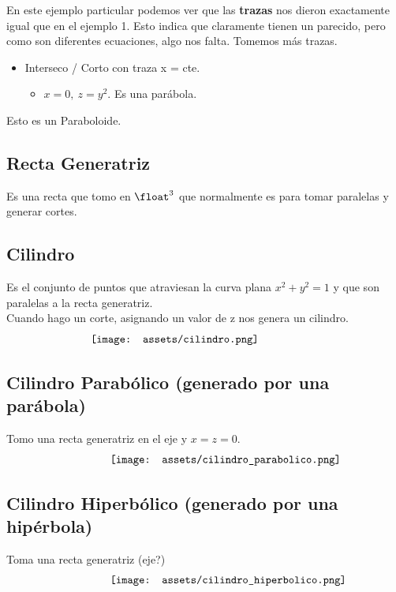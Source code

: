 \documentclass[10pt,a4paper]{article}
\begin{document}
En este ejemplo particular podemos ver que las \textbf{trazas} nos dieron exactamente igual que en el ejemplo 1. Esto indica que claramente tienen un parecido, pero como son diferentes ecuaciones, algo nos falta. Tomemos más trazas. \\
\begin{itemize}
    \item Interseco / Corto con traza x = cte.
    \begin{itemize}
        \item $x=0, \ z=y^{2}$. Es una parábola.
    \end{itemize}
\end{itemize}
Esto es un Paraboloide.
\subsection*{Recta Generatriz}
Es una recta que tomo en $\float^{3}$ que normalmente es para tomar paralelas y generar cortes.
\subsection*{Cilindro}
Es el conjunto de puntos que atraviesan la curva plana $x^{2} + y^{2} = 1$ y que son paralelas a la recta generatriz. \\
Cuando hago un corte, asignando un valor de z nos genera un cilindro.
\[\begin{minipage}[b]{0.6\textwidth}
    \texttt{[image: assets/cilindro.png]}
\end{minipage}\]
\subsection*{Cilindro Parabólico (generado por una parábola)}
Tomo una recta generatriz en el eje y $x=z=0$.
\[\begin{minipage}[b]{0.5\textwidth}
    \texttt{[image: assets/cilindro\_parabolico.png]}
\end{minipage}\]
\subsection*{Cilindro Hiperbólico (generado por una hipérbola)}
Toma una recta generatriz (eje?)
\[\begin{minipage}[b]{0.5\textwidth}
    \texttt{[image: assets/cilindro\_hiperbolico.png]}
\end{minipage}\]
\end{document}
